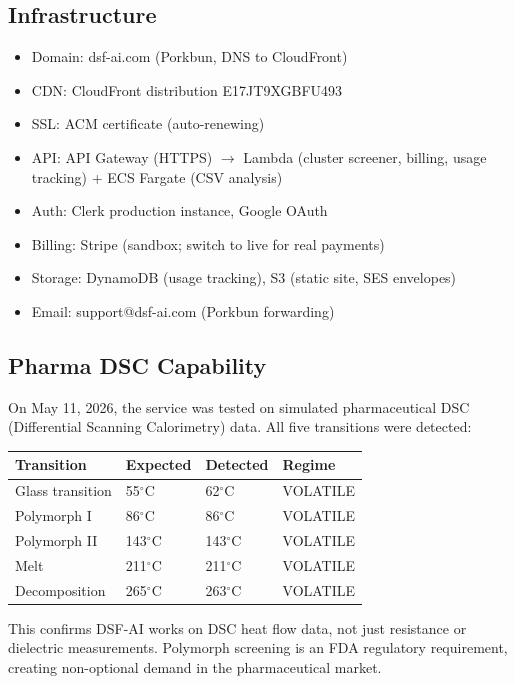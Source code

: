 \documentclass[11pt,letterpaper]{article}
\begin{document}
\subsection{Infrastructure}

\begin{itemize}
  \item Domain: dsf-ai.com (Porkbun, DNS to CloudFront)
  \item CDN: CloudFront distribution E17JT9XGBFU493
  \item SSL: ACM certificate (auto-renewing)
  \item API: API Gateway (HTTPS) $\to$ Lambda (cluster screener,
    billing, usage tracking) + ECS Fargate (CSV analysis)
  \item Auth: Clerk production instance, Google OAuth
  \item Billing: Stripe (sandbox; switch to live for real payments)
  \item Storage: DynamoDB (usage tracking), S3 (static site, SES
    envelopes)
  \item Email: support@dsf-ai.com (Porkbun forwarding)
\end{itemize}

\subsection{Pharma DSC Capability}

On May 11, 2026, the service was tested on simulated
pharmaceutical DSC (Differential Scanning Calorimetry) data.
All five transitions were detected:

\begin{center}
\begin{tabular}{@{}llll@{}}
\toprule
\textbf{Transition} & \textbf{Expected} & \textbf{Detected} &
  \textbf{Regime} \\
\midrule
Glass transition & 55$^\circ$C & 62$^\circ$C & VOLATILE \\
Polymorph I & 86$^\circ$C & 86$^\circ$C & VOLATILE \\
Polymorph II & 143$^\circ$C & 143$^\circ$C & VOLATILE \\
Melt & 211$^\circ$C & 211$^\circ$C & VOLATILE \\
Decomposition & 265$^\circ$C & 263$^\circ$C & VOLATILE \\
\bottomrule
\end{tabular}
\end{center}

This confirms DSF-AI works on DSC heat flow data, not just
resistance or dielectric measurements. Polymorph screening is
an FDA regulatory requirement, creating non-optional demand
in the pharmaceutical market.
\end{document}
